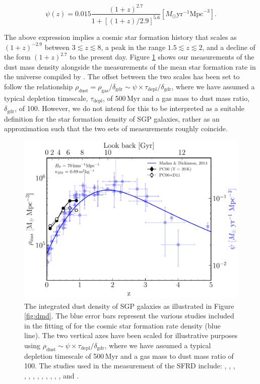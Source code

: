 \begin{equation}
    \psi(z) = 0.015\frac{(1+z)^{2.7}}{1+[(1+z)/2.9]^{5.6}} [M_{\odot}\textrm{yr}^{-1}\textrm{Mpc}^{-3}].
    \label{eq:madau_sfrd}
\end{equation}

The above expression implies a cosmic star formation history that scales as $(1+z)^{-2.9}$ between $3 \lesssim z \lesssim 8$, a peak in the range $1.5 \lesssim z \lesssim 2$, and a decline of the form $(1+z)^{2.7}$ to the present day. Figure \ref{fig:sfrd} shows our measurements of the dust mass density alongside the measurements of the mean star formation rate in the universe compiled by \citealt{Madau_2014}. The offset between the two scales has been set to follow the relationship $\rho_{\textrm{dust}} = \rho_{\textrm{gas}}/\delta_{\textrm{gdr}} \sim \psi \times\tau_{\textrm{depl}}/\delta_{\textrm{gdr}}$, where we have assumed a typical depletion timescale, $\tau_{\textrm{depl}}$, of 500\,Myr and a gas mass to dust mass ratio, $\delta_{\textrm{gdr}}$, of 100. However, we do not intend for this to be interpreted as a suitable definition for the star formation density of SGP galaxies, rather as an approximation such that the two sets of measurements roughly coincide. 

\begin{figure}
	\centering
	\includegraphics[width=0.75\columnwidth]{Figures/sfrd.pdf}
	\caption[Comparison of dust mass density and the cosmic star formation rate density]{The integrated dust density of SGP galaxies as illustrated in Figure \ref{fig:dmd}. The blue error bars represent the various studies included in the fitting of \citealt{Madau_2014} for the cosmic star formation rate density (blue line). The two vertical axes have been scaled for illustrative purposes using $\rho_{\textrm{dust}} \sim \psi \times\tau_{\textrm{depl}}/\delta_{\textrm{gdr}}$, where we have assumed a typical depletion timescale of 500\,Myr and a gas mass to dust mass ratio of 100. The studies used in the measurement of the SFRD include: \citealt{Sanders_2003}, \citealt{Takeuchi_2003}, \citealt{Wyder_2005}, \citealt{Schiminovich_2005}, \citealt{Reddy_2009}, \citealt{Robotham_2011}, \citealt{Magnelli_2011}, \citealt{Cucciati_2012}, \citealt{Bouwens_2012b}, \citealt{Bouwens_2012a}, \citealt{Schenker_2013}, \citealt{Magnelli_2013}, \citealt{Gruppioni_2013} and \citealt{Dahlen_2007}.}
    \label{fig:sfrd}
\end{figure}

